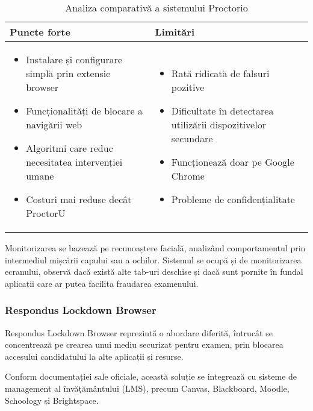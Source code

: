 \documentclass[12pt,a4paper]{article}
\begin{document}
\begin{table}[H]
\centering
\begin{tabular}{|p{8.5cm}|p{8.5cm}|}
\hline
\textbf{Puncte forte} & \textbf{Limitări} \\
\hline
\begin{itemize}
    \item Instalare și configurare simplă prin extensie browser
    \item Funcționalități de blocare a navigării web
    \item Algoritmi care reduc necesitatea intervenției umane
    \item Costuri mai reduse decât ProctorU
\end{itemize} & 
\begin{itemize}
    \item Rată ridicată de falsuri pozitive
    \item Dificultate în detectarea utilizării dispozitivelor secundare
    \item Funcționează doar pe Google Chrome
    \item Probleme de confidențialitate
\end{itemize} \\
\hline
\end{tabular}
\caption{Analiza comparativă a sistemului Proctorio}
\end{table}

Monitorizarea se bazează pe recunoaștere facială, analizând comportamentul prin 
intermediul mișcării capului sau a ochilor. Sistemul se ocupă și de monitorizarea 
ecranului, observă dacă există alte tab-uri deschise și dacă sunt pornite în fundal 
aplicații care ar putea facilita fraudarea examenului.

\subsubsection{Respondus Lockdown Browser}
Respondus Lockdown Browser reprezintă o abordare diferită, 
întrucât se concentrează pe crearea unui mediu securizat pentru examen,
prin blocarea accesului candidatului la alte aplicații și resurse.

Conform documentației sale oficiale\cite{respondus}, această soluție se
integrează cu sisteme de management al învățământului (LMS), precum Canvas,
Blackboard, Moodle, Schoology și Brightspace.
\end{document}
